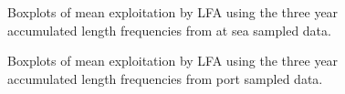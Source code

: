 \documentclass[11pt]{article}
\newcommand{\e}{/backup/bio_data/bio.lobster/figures/} %
\begin{document}
\begin{figure}
\centering
              \caption{Boxplots of mean exploitation by LFA using the three year accumulated length frequencies from at sea sampled data.}
\end{figure}

\begin{figure}
\centering
              \caption{Boxplots of mean exploitation by LFA using the three year accumulated length frequencies from port sampled data.}
\end{figure}
\end{document}

